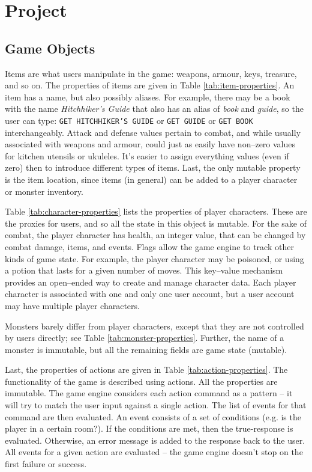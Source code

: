 \documentclass{article}
\newcommand{\enterProblemHeader}[1]{
}
\newcommand{\exitProblemHeader}[1]{
\nobreak\extramarks{#1}{}\nobreak
}
\newcounter{homeworkProblemCounter} %
\newcommand{\homeworkProblemName}{}
\newenvironment{homeworkProblem}[1][Problem \arabic{homeworkProblemCounter}]{ %
\stepcounter{homeworkProblemCounter} %
\renewcommand{\homeworkProblemName}{#1} %
\section{\homeworkProblemName} %
\enterProblemHeader{\homeworkProblemName} %
}{
\exitProblemHeader{\homeworkProblemName} %
}
\newcommand{\homeworkSectionName}{}
\newenvironment{homeworkSection}[1]{ %
\renewcommand{\homeworkSectionName}{#1} %
\subsection{\homeworkSectionName} %
\enterProblemHeader{\homeworkProblemName\ [\homeworkSectionName]} %
}{
\enterProblemHeader{\homeworkProblemName} %
}
\begin{document}
\begin{homeworkProblem}[Project]
\begin{homeworkSection}{Game Objects}
	Items are what users manipulate in the game: weapons, armour, keys, treasure, and so on. The properties of items are given in Table \ref{tab:item-properties}. An item has a name, but also possibly aliases. For example, there may be a book with the name \textit{Hitchhiker's Guide} that also has an alias of \textit{book} and \textit{guide}, so the user can type: \texttt{GET HITCHHIKER'S GUIDE} or \texttt{GET GUIDE} or \texttt{GET BOOK} interchangeably. Attack and defense values pertain to combat, and while usually associated with weapons and armour, could just as easily have non--zero values for kitchen utensils or ukuleles. It's easier to assign everything values (even if zero) then to introduce different types of items. Last, the only mutable property is the item location, since items (in general) can be added to a player character or monster inventory.

	Table \ref{tab:character-properties} lists the properties of player characters. These are the proxies for users, and so all the state in this object is mutable. For the sake of combat, the player character has health, an integer value, that can be changed by combat damage, items, and events. Flags allow the game engine to track other kinds of game state. For example, the player character may be poisoned, or using a potion that lasts for a given number of moves. This key--value mechanism provides an open--ended way to create and manage character data. Each player character is associated with one and only one user account, but a user account may have multiple player characters.

	Monsters barely differ from player characters, except that they are not controlled by users directly; see Table \ref{tab:monster-properties}. Further, the name of a monster is immutable, but all the remaining fields are game state (mutable).

	Last, the properties of actions are given in Table \ref{tab:action-properties}. The functionality of the game is described using actions. All the properties are immutable. The game engine considers each action command as a pattern -- it will try to match the user input against a single action. The list of events for that command are then evaluated. An event consists of a set of conditions (e.g. is the player in a certain room?). If the conditions are met, then the true-response is evaluated. Otherwise, an error message is added to the response back to the user. All events for a given action are evaluated -- the game engine doesn't stop on the first failure or success.
\end{homeworkSection}


\end{homeworkProblem}
\end{document}
